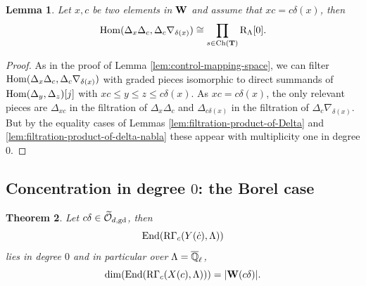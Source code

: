 \documentclass[article, 10pt, oneside, reqno]{amsart}
\theoremstyle{plain}
\newtheorem{thm}{Theorem}[subsection]
\newtheorem{lem}[thm]{Lemma}
\theoremstyle{definition}
\theoremstyle{remark}
\newcommand{\gd}{\mathrm{gd}}
\begin{document}
\begin{lem}\label{lem:control-mapping-space-equality-case}
Let $x,c$ be two elements in $\mathbf{W}$ and assume that $xc = c\delta(x)$, then 
$$\mathrm{Hom}(\Delta_x\Delta_c, \Delta_c\nabla_{\delta(x)}) \cong \prod_{s \in \mathrm{Ch}(\mathbf{T})}\mathrm{R}_{\Lambda}[0].$$
\end{lem}

\begin{proof}
As in the proof of Lemma \ref{lem:control-mapping-space}, we can filter $\mathrm{Hom}(\Delta_x\Delta_c, \Delta_c\nabla_{\delta(x)})$ with graded pieces isomorphic to direct summands of $\mathrm{Hom}(\Delta_y, \Delta_z)[j]$ with $xc \leq y \leq z \leq c\delta(x)$. As $xc = c\delta(x)$, the only relevant pieces are $\Delta_{xc}$ in the filtration of $\Delta_x\Delta_c$ and $\Delta_{c\delta(x)}$ in the filtration of $\Delta_c\nabla_{\delta(x)}$. But by the equality cases of Lemmas \ref{lem:filtration-product-of-Delta} and \ref{lem:filtration-product-of-delta-nabla} these appear with multiplicity one in degree $0$.
\end{proof}

 
\subsection{Concentration in degree $0$: the Borel case}

\begin{thm}\label{thm:concentration-degree-0}
Let $c\delta \in \widetilde{\Ocal}_{d,\gd}$, then 
$$\mathrm{End}(\mathrm{R\Gamma}_c(Y(\dot{c}), \Lambda))$$
lies in degree $0$ and in particular over $\Lambda = \overline{\mathbb{Q}}_{\ell}$, 
$$\dim(\mathrm{End}(\mathrm{R\Gamma}_c(X(c), \Lambda))) = |\mathbf{W}(c\delta)|.$$
\end{thm}
\end{document}
